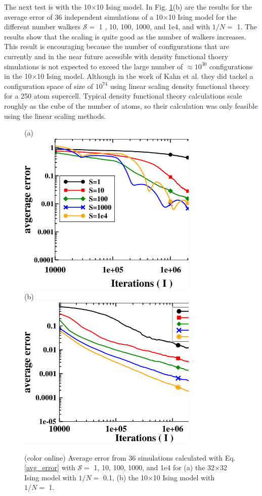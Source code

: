 \documentclass[aps,pre,reprint,superscriptaddress,showkeys]{revtex4-2}
\begin{document}
  The next test is with the 10$\times$10 Ising model. In Fig. \ref{thirtytwo_Stest}(b) are  the results for the average error of 36 independent simulations of a 10$\times$10 Ising model for the different number walkers $\mathcal{S}=$ 1 , 10, 100, 1000, and 1e4, and  with $1/N=$ 1. The results show that the scaling is quite good as the number of walkers increases. This result is encouraging because the number of configurations that are currently and in the near future acessible with density functional thoery simulations is not expected to exceed the large number of $\approx 10^{30}$ configurations in the 10$\times$10 Ising model.  Although in the work of  Kahn et al. \cite{FP_Wang_Landau_CuZn} they did tackel a configuration space of size of $10^{74}$ using linear scaling density functional theory for a 250 atom supercell. Typical density functional theory calculations scale roughly as the cube of the number of atoms, so their calculation was only feasible using the linear scaling methods.   
\begin{figure}[h!]
(a)\\
\includegraphics[width=8.6cm]{fig1a.eps}\\
(b)\\
\includegraphics[width=8.6cm]{fig1b.eps}
\caption{(color online) Average error from 36 simulations calculated with Eq. \ref{avg_error} with $\mathcal{S}=$ 1, 10, 100, 1000, and 1e4 for  (a) the 32$\times$32 Ising model with $1/N=$ 0.1, (b) the 10$\times$10 Ising model with $1/N =$ 1. \label{thirtytwo_Stest} }
\end{figure}
\end{document}
